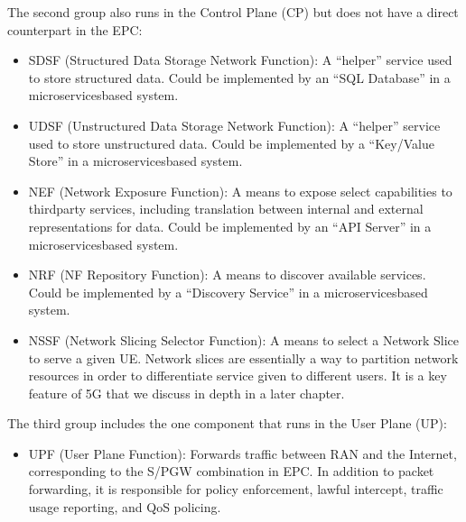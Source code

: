 \documentclass[a4paper,11pt,english]{sphinxmanual}
\begin{document}
\sphinxAtStartPar
The second group also runs in the Control Plane (CP) but does not have
a direct counterpart in the EPC:
\begin{itemize}
\item {} 
\sphinxAtStartPar
SDSF (Structured Data Storage Network Function): A “helper” service
used to store structured data. Could be implemented by an “SQL
Database” in a microservices\sphinxhyphen{}based system.

\item {} 
\sphinxAtStartPar
UDSF (Unstructured Data Storage Network Function): A “helper” service
used to store unstructured data. Could be implemented by a “Key/Value
Store” in a microservices\sphinxhyphen{}based system.

\item {} 
\sphinxAtStartPar
NEF (Network Exposure Function): A means to expose select
capabilities to third\sphinxhyphen{}party services, including translation between
internal and external representations for data. Could be implemented
by an “API Server” in a microservices\sphinxhyphen{}based system.

\item {} 
\sphinxAtStartPar
NRF (NF Repository Function): A means to discover available services.
Could be implemented by a “Discovery Service” in a
microservices\sphinxhyphen{}based system.

\item {} 
\sphinxAtStartPar
NSSF (Network Slicing Selector Function): A means to select a Network
Slice to serve a given UE. Network slices are essentially a way to
partition network resources in order to
differentiate service given to different users. It is a key feature
of 5G that we discuss in depth in a later chapter.

\end{itemize}

\sphinxAtStartPar
The third group includes the one component that runs in the User Plane
(UP):
\begin{itemize}
\item {} 
\sphinxAtStartPar
UPF (User Plane Function): Forwards traffic between RAN and the
Internet, corresponding to the S/PGW combination in EPC. In addition
to packet forwarding, it is responsible for policy enforcement, lawful
intercept, traffic usage reporting, and QoS policing.

\end{itemize}
\end{document}
